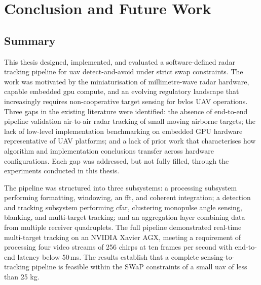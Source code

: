 \chapter{Conclusion and Future Work}

\section{Summary}

This thesis designed, implemented, and evaluated a software-defined radar tracking pipeline
for \gls{uav} detect-and-avoid under strict \gls{swap} constraints. The work was motivated
by the miniaturisation of millimetre-wave radar hardware, capable embedded
\gls{gpu} compute, and an evolving regulatory landscape that increasingly requires
non-cooperative target sensing for \gls{bvlos} UAV operations. Three gaps in the existing
literature were identified: the absence of end-to-end pipeline validation air-to-air radar 
tracking of small
moving airborne targets; the lack of low-level implementation benchmarking on embedded
GPU hardware representative of UAV platforms; and a lack of prior work that characterises
how algorithm and implementation conclusions transfer across hardware configurations.
Each gap was addressed, but not fully filled, through the experiments conducted in this thesis.

The pipeline was structured into three subsystems: a processing subsystem performing
formatting, windowing, an \gls{fft}, and coherent integration; a detection and tracking subsystem
performing \gls{cfar}, clustering monopulse angle sensing, blanking, and multi-target tracking; 
and
an aggregation layer combining data from multiple receiver quadruplets. The full pipeline
demonstrated real-time multi-target tracking on an NVIDIA Xavier AGX, meeting a 
requirement of processing four
video streams of 256 chirps at ten frames per second with end-to-end latency below
50\,ms. The results establish that a complete sensing-to-tracking pipeline is feasible within the
SWaP constraints of a small \gls{uav} of less than 25 kg.


